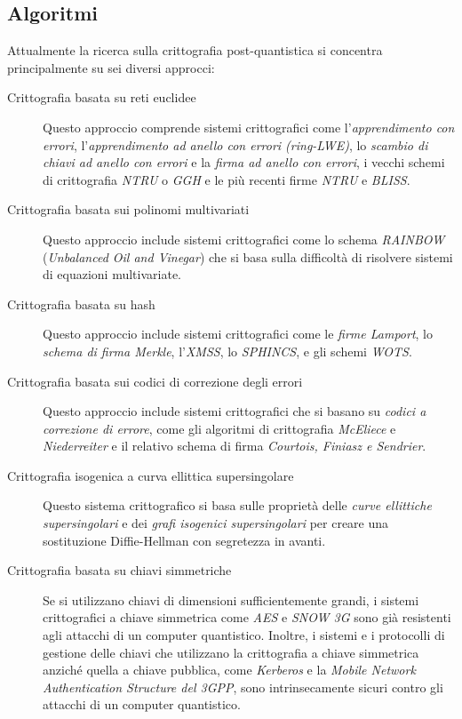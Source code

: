 \subsection{Algoritmi}
Attualmente la ricerca sulla crittografia post-quantistica si concentra principalmente su sei diversi approcci:
\begin{description}
  \item[Crittografia basata su reti euclidee] Questo approccio comprende sistemi crittografici come l'\textit{apprendimento con errori}, l'\textit{apprendimento ad anello con errori (ring-LWE)}, lo \textit{scambio di chiavi ad anello con errori} e la \textit{firma ad anello con errori}, i vecchi schemi di crittografia \textit{NTRU} o \textit{GGH} e le più recenti firme \textit{NTRU} e \textit{BLISS}.
  \item[Crittografia basata sui polinomi multivariati] Questo approccio include sistemi crittografici come lo schema \textit{RAINBOW} (\textit{Unbalanced Oil and Vinegar}) che si basa sulla difficoltà di risolvere sistemi di equazioni multivariate.
  \item[Crittografia basata su hash] Questo approccio include sistemi crittografici come le \textit{firme Lamport}, lo \textit{schema di firma Merkle}, l'\textit{XMSS}, lo \textit{SPHINCS}, e gli schemi \textit{WOTS}.
  \item[Crittografia basata sui codici di correzione degli errori] Questo approccio include sistemi crittografici che si basano su \textit{codici a correzione di errore}, come gli algoritmi di crittografia \textit{McEliece} e \textit{Niederreiter} e il relativo schema di firma \textit{Courtois, Finiasz e Sendrier}.
  \item[Crittografia isogenica a curva ellittica supersingolare] Questo sistema crittografico si basa sulle proprietà delle \textit{curve ellittiche supersingolari} e dei \textit{grafi isogenici supersingolari} per creare una sostituzione Diffie-Hellman con segretezza in avanti.
  \item[Crittografia basata su chiavi simmetriche] Se si utilizzano chiavi di dimensioni sufficientemente grandi, i sistemi crittografici a chiave simmetrica come \textit{AES} e \textit{SNOW 3G} sono già resistenti agli attacchi di un computer quantistico. Inoltre, i sistemi e i protocolli di gestione delle chiavi che utilizzano la crittografia a chiave simmetrica anziché quella a chiave pubblica, come \textit{Kerberos} e la \textit{Mobile Network Authentication Structure del 3GPP}, sono intrinsecamente sicuri contro gli attacchi di un computer quantistico.
\end{description}